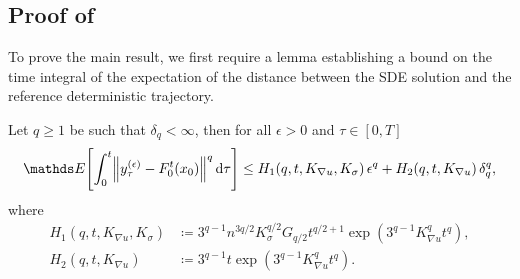 \subsection{Proof of }\label{app:main_thm_proof}
To prove the main result, we first require a lemma establishing a bound on the time integral of the expectation of the distance between the SDE solution and the reference deterministic trajectory.

\begin{lemma}\label{lem:z_int_bound}
	Let \(q \geq 1\) be such that \(\delta_q < \infty\), then for all \(\epsilon > 0\) and \(\tau \in [0,T]\)
	\begin{equation*}
		\avg{\int_0^t{\norm{y_\tau^{(\epsilon)} - F_0^t\!\left(x_0\right)}^q\dif\tau}} \leq H_1\!\left(q,t, K_{\nabla u}, K_{\sigma}\right)\epsilon^q + H_2\!\left(q,t, K_{\nabla u}\right)\delta_q^q,
	\end{equation*}
	where
	\begin{align*}
		H_1\!\left(q,t, K_{\nabla u}, K_{\sigma}\right) & \coloneqq 3^{q-1} n^{3q/2} K_{\sigma}^{q/2} G_{q/2} t^{q/2 + 1}\exp\left(3^{q-1} K_{\nabla u}^q t^q\right), \\
		H_2\!\left(q,t, K_{\nabla u}\right)             & \coloneqq 3^{q-1} t \exp\left(3^{q-1} K_{\nabla u}^q t^q\right).
	\end{align*}
\end{lemma}

